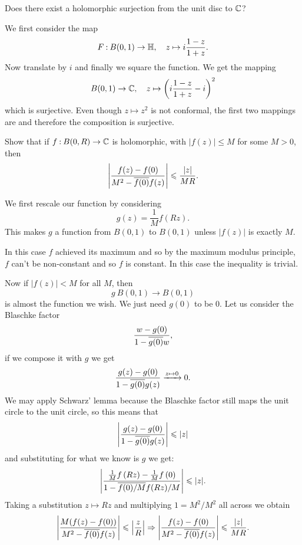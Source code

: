 \documentclass[12pt]{memoir}
\begin{document}
\begin{Ej}
    Does there exist a holomorphic surjection from the unit disc to $\mathbb{C}$? 
\end{Ej}

\begin{ptcbr}
    We first consider the map 
    $$F\mathbin{:} B(0,1)\to\mathbb{H},\quad z\mapsto i\frac{1-z}{1+z}.$$
    Now translate by $i$ and finally we square the function. We get the mapping 
    $$B(0,1)\to\mathbb{C},\quad z\mapsto \left(i\frac{1-z}{1+z}-i\right)^2$$
    which is surjective. Even though $z\mapsto z^2$ is not conformal, the first two mappings are and therefore the composition is surjective.
  \end{ptcbr}

\begin{Ej}
    Show that if $f\mathbin{:} B(0,R)\to\mathbb{C}$ is holomorphic, with $|f(z)| \leq M$ for some $M > 0$, then
    $$\left|\frac{f(z)-f(0)}{M^2-\overline{f(0)}f(z)}\right|\leqslant\frac{|z|}{MR}.$$
\end{Ej}

\begin{ptcbr}
    We first rescale our function by considering 
    $$g(z)=\frac{1}{M}f\left(Rz\right).$$
    This makes $g$ a function from $B(0,1)$ to $B(0,1)$ unless $|f(z)|$ is exactly $M$.\par 
    In this case $f$ achieved its maximum and so by the maximum modulus principle, $f$ can't be non-constant and so $f$ is constant. In this case the inequality is trivial.\par 
    Now if $|f(z)|<M$ for all $M$, then 
    $$g\: B(0,1)\to B(0,1)$$
    is almost the function we wish. We just need $g(0)$ to be $0$. Let us consider the Blaschke factor
    $$\frac{w-g(0)}{1-\overline{g(0)}w},$$
    if we compose it with $g$ we get 
    $$\frac{g(z)-g(0)}{1-\overline{g(0)}g(z)}\xrightarrow[]{z\mapsto 0}0.$$
    We may apply Schwarz' lemma because the Blaschke factor still maps the unit circle to the unit circle, so this means that  
    $$\left|\frac{g(z)-g(0)}{1-\overline{g(0)}g(z)}\right|\leqslant|z|$$
    and substituting for what we know is $g$ we get:
    $$\left|\frac{\frac{1}{M}f\left(Rz\right)-\frac{1}{M}f\left(0\right)}{1-\overline{f(0)/M}f(Rz)/M}\right|\leqslant|z|.$$
    Taking a substitution $z\mapsto Rz$ and multiplying $1=M^2/M^2$ all across we obtain 
    $$\left|\frac{M(f(z)-f(0))}{M^2-\overline{f(0)}f(z)}\right|\leqslant\left|\frac zR\right|\Rightarrow \left|\frac{f(z)-f(0)}{M^2-\overline{f(0)}f(z)}\right|\leqslant\frac{|z|}{MR}.$$

\end{ptcbr}
\end{document}
